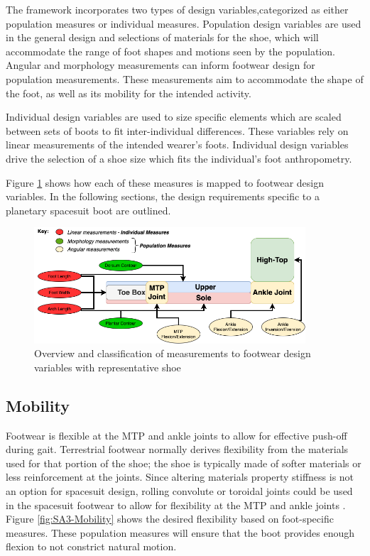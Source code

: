 \documentclass[defaultstyle,11pt]{thesis}
\begin{document}
The framework incorporates two types of design variables,categorized as either population measures or individual measures.
Population design variables are used in the general design and selections of materials for the shoe, which will accommodate the range of foot shapes and motions seen by the population.
Angular and morphology measurements can inform footwear design for population measurements.
These measurements aim to accommodate the shape of the foot, as well as its mobility for the intended activity.

Individual design variables are used to size specific elements which are scaled between sets of boots to fit inter-individual differences.
These variables rely on linear measurements of the intended wearer's foots.
Individual design variables drive the selection of a shoe size which fits the individual's foot anthropometry.

Figure \ref{fig:SA3-Overview} shows how each of these measures is mapped to footwear design variables.
In the following sections, the design requirements specific to a planetary spacesuit boot are outlined.

\begin{figure}
\hypertarget{fig:SA3-Overview}{%
\centering
\includegraphics[width=0.9\textwidth,height=\textheight]{../fig/SA3/Overview.png}
\caption{Overview and classification of measurements to footwear design variables with representative shoe}\label{fig:SA3-Overview}
}
\end{figure}

\hypertarget{mobility}{%
\subsection{Mobility}\label{mobility}}

Footwear is flexible at the MTP and ankle joints to allow for effective push-off during gait. Terrestrial footwear normally derives flexibility from the materials used for that portion of the shoe; the shoe is typically made of softer materials or less reinforcement at the joints. Since altering materials property stiffness is not an option for spacesuit design, rolling convolute or toroidal joints could be used in the spacesuit footwear to allow for flexibility at the MTP and ankle joints \citep{Harris2001}.
Figure \ref{fig:SA3-Mobility} shows the desired flexibility based on foot-specific measures. These population measures will ensure that the boot provides enough flexion to not constrict natural motion.
\end{document}
